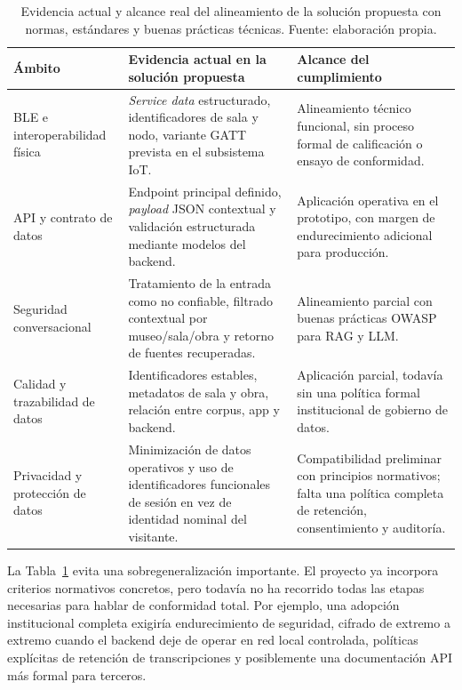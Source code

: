 \begin{table}[!ht]
    \centering
    \scriptsize
    \setlength{\tabcolsep}{4pt}
    \begin{tabular}{>{\raggedright\arraybackslash}p{3.6cm} >{\raggedright\arraybackslash}p{6.1cm} >{\raggedright\arraybackslash}p{4.9cm}}
        \hline
        \textbf{Ámbito} & \textbf{Evidencia actual en la solución propuesta} & \textbf{Alcance del cumplimiento} \\
        \hline
        BLE e interoperabilidad física & \textit{Service data} estructurado, identificadores de sala y nodo, variante GATT prevista en el subsistema IoT. & Alineamiento técnico funcional, sin proceso formal de calificación o ensayo de conformidad. \\
        API y contrato de datos & Endpoint principal definido, \textit{payload} JSON contextual y validación estructurada mediante modelos del backend. & Aplicación operativa en el prototipo, con margen de endurecimiento adicional para producción. \\
        Seguridad conversacional & Tratamiento de la entrada como no confiable, filtrado contextual por museo/sala/obra y retorno de fuentes recuperadas. & Alineamiento parcial con buenas prácticas OWASP para RAG y LLM. \\
        Calidad y trazabilidad de datos & Identificadores estables, metadatos de sala y obra, relación entre corpus, app y backend. & Aplicación parcial, todavía sin una política formal institucional de gobierno de datos. \\
        Privacidad y protección de datos & Minimización de datos operativos y uso de identificadores funcionales de sesión en vez de identidad nominal del visitante. & Compatibilidad preliminar con principios normativos; falta una política completa de retención, consentimiento y auditoría. \\
        \hline
    \end{tabular}
    \caption[Alcance real del alineamiento normativo de la solución propuesta]{Evidencia actual y alcance real del alineamiento de la solución propuesta con normas, estándares y buenas prácticas técnicas. Fuente: elaboración propia.}
    \label{tab:alcance-cumplimiento-museiq}
\end{table}

La Tabla~\ref{tab:alcance-cumplimiento-museiq} evita una sobregeneralización importante. El proyecto ya incorpora criterios normativos concretos, pero todavía no ha recorrido todas las etapas necesarias para hablar de conformidad total. Por ejemplo, una adopción institucional completa exigiría endurecimiento de seguridad, cifrado de extremo a extremo cuando el backend deje de operar en red local controlada, políticas explícitas de retención de transcripciones y posiblemente una documentación API más formal para terceros.

